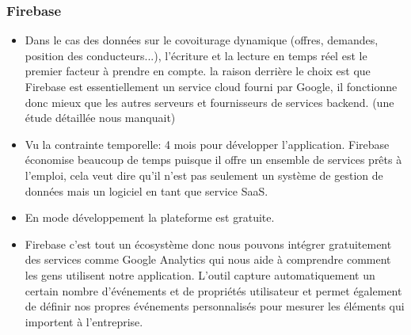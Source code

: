 \subsubsection{Firebase} %
\label{ssub:firebase}
\begin{itemize}
	\item Dans le cas des données sur le covoiturage dynamique (offres, demandes, position des conducteurs...), l’écriture et la lecture en temps réel est le premier facteur à prendre en compte. la raison derrière le choix est que Firebase est essentiellement un service cloud fourni par Google, il fonctionne donc mieux que les autres serveurs et fournisseurs de services backend. (une étude détaillée nous manquait)
	\item Vu la contrainte temporelle: 4 mois pour développer l'application. Firebase économise beaucoup de temps puisque il offre un ensemble de services prêts à l'emploi, cela veut dire qu'il n'est pas seulement un système de gestion de données mais un logiciel en tant que service SaaS.
	\item En mode développement la plateforme est gratuite.
	\item Firebase c'est tout un écosystème donc nous pouvons intégrer gratuitement des services comme Google Analytics qui nous aide à comprendre comment les gens utilisent notre application. L'outil capture automatiquement un certain nombre d'événements et de propriétés utilisateur et permet également de définir nos propres événements personnalisés pour mesurer les éléments qui importent à l'entreprise. 
\end{itemize}
